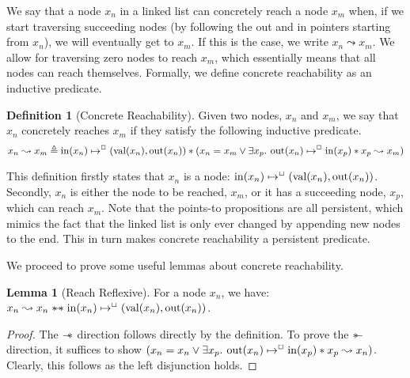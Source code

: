 \documentclass[a4paper, 10pt]{report}
\theoremstyle{definition}
\newtheorem{lemma}[theorem]{Lemma}
\newtheorem{definition}{Definition}[section]
\newcommand{\nIn}[1]{\operatorname{in}(#1)}
\newcommand{\nVal}[1]{\operatorname{val}(#1)}
\newcommand{\nOut}[1]{\operatorname{out}(#1)}
\newcommand{\node}{x}
\newcommand{\nodeM}[1]{\node_{#1}}
\newcommand{\isNode}[1]{\nIn{#1} \mapsto^{\persistently} (\nVal{#1}, \nOut{#1})}
\newcommand{\reach}[2]{#1 \leadsto #2}
\begin{document}
We say that a node $\nodeM{n}$ in a linked list can concretely reach a node $\nodeM{m}$ when, if we start traversing succeeding nodes (by following the out and in pointers starting from $\nodeM{n}$), we will eventually get to $\nodeM{m}$. If this is the case, we write $\reach{\nodeM{n}}{\nodeM{m}}$. We allow for traversing zero nodes to reach $\nodeM{m}$, which essentially means that all nodes can reach themselves. Formally, we define concrete reachability as an inductive predicate.
\begin{definition}[Concrete Reachability]
  Given two nodes, $\nodeM{n}$ and $\nodeM{m}$, we say that $\nodeM{n}$ concretely reaches $\nodeM{m}$ if they satisfy the following inductive predicate.
  \begin{equation*}
    \reach{\nodeM{n}}{\nodeM{m}} \eqdef \isNode{\nodeM{n}} \star{} (\nodeM{n} = \nodeM{m} \lor{} \Exists \nodeM{p} . \nOut{\nodeM{n}} \mapsto^{\persistently} \nIn{\nodeM{p}} \star{} \reach{\nodeM{p}}{\nodeM{m}})
  \end{equation*}
\end{definition}
This definition firstly states that $\nodeM{n}$ is a node: $\isNode{\nodeM{n}}$. Secondly, $\nodeM{n}$ is either the node to be reached, $\nodeM{m}$, or it has a succeeding node, $\nodeM{p}$, which can reach $\nodeM{m}$.
Note that the points-to propositions are all persistent, which mimics the fact that the linked list is only ever changed by appending new nodes to the end. This in turn makes concrete reachability a persistent predicate.

We proceed to prove some useful lemmas about concrete reachability.
\begin{lemma}[Reach Reflexive]\label{lemma:reach-reflexive}
  For a node $\nodeM{n}$, we have: $\reach{\nodeM{n}}{\nodeM{n}} \wandIff \isNode{\nodeM{n}}$.
\end{lemma}
\begin{proof}
  The $\mathrel{-\!\!*}$ direction follows directly by the definition. To prove the $\mathrel{*\!\!-}$ direction, it suffices to show $(\nodeM{n} = \nodeM{n} \lor{} \Exists \nodeM{p} . \nOut{\nodeM{n}} \mapsto^{\persistently} \nIn{\nodeM{p}} \star{} \reach{\nodeM{p}}{\nodeM{n}})$. Clearly, this follows as the left disjunction holds.
\end{proof}
\end{document}
